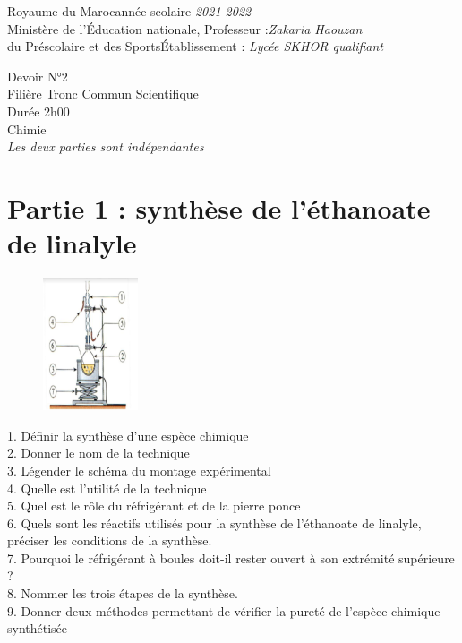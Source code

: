 \documentclass[12pt]{article}
\newcommand\headerMe[2]{\noindent{}#1\hfill#2}
\begin{document}
\headerMe{Royaume du Maroc}{année scolaire \emph{2021-2022}}\\
\headerMe{Ministère de l'Éducation nationale, }{  Professeur :\emph{Zakaria Haouzan}}\\
\headerMe{du Préscolaire et des Sports}{Établissement : \emph{Lycée SKHOR qualifiant}}\\

\begin{center}
Devoir N°2 \\
    Filière Tronc Commun Scientifique\\
Durée 2h00
\\
    \vspace{.2cm}
\hrulefill
\Large{Chimie }
\hrulefill\\
    \emph{Les deux parties sont indépendantes}
\end{center}







 \section*{Partie 1 : synthèse de l’éthanoate de linalyle}
            \begin{figure}
            \includegraphics[width=0.25\textwidth]{./img/img00.png}
            \end{figure}
1.  Définir la synthèse d’une espèce chimique
\\2. Donner le nom de la technique
\\3. Légender le schéma du montage expérimental
\\4. Quelle est l’utilité de la technique
\\5. Quel est le rôle du réfrigérant et de la pierre ponce
\\6. Quels sont les réactifs utilisés pour la synthèse de l’éthanoate de linalyle,
préciser les conditions de la synthèse.
\\7. Pourquoi le réfrigérant à boules doit-il rester ouvert à son extrémité
supérieure ?
\\8. Nommer les trois étapes de la synthèse.
\\9. Donner deux méthodes permettant de vérifier la pureté de l’espèce
chimique synthétisée
\end{document}
